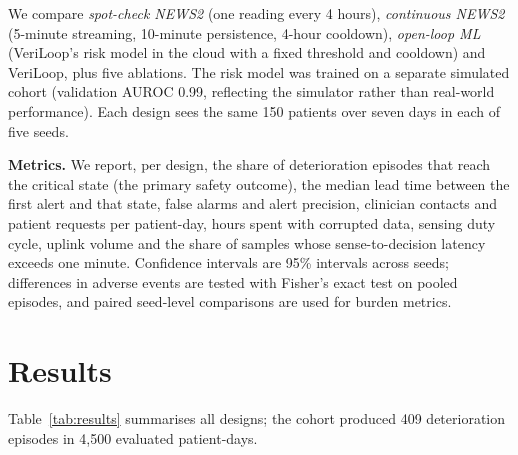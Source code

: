 \documentclass[journal,twoside,web]{IEEEmiot}
\begin{document}
We compare \emph{spot-check NEWS2} (one reading every 4 hours), \emph{continuous NEWS2} (5-minute streaming, 10-minute
persistence, 4-hour cooldown), \emph{open-loop ML} (VeriLoop's risk model in the cloud with a fixed threshold and
cooldown) and VeriLoop, plus five ablations. The risk model was trained on a separate simulated cohort (validation AUROC
0.99, reflecting the simulator rather than real-world performance). Each design sees the same 150 patients over seven
days in each of five seeds.

\textbf{Metrics.} We report, per design, the share of deterioration episodes that reach the critical state (the primary
safety outcome), the median lead time between the first alert and that state, false alarms and alert precision,
clinician contacts and patient requests per patient-day, hours spent with corrupted data, sensing duty cycle, uplink
volume and the share of samples whose sense-to-decision latency exceeds one minute. Confidence intervals are 95\%
intervals across seeds; differences in adverse events are tested with Fisher's exact test on pooled episodes, and
paired seed-level comparisons are used for burden metrics.

\section{Results}

Table~\ref{tab:results} summarises all designs; the cohort produced 409 deterioration episodes in 4,500 evaluated
patient-days.
\end{document}
